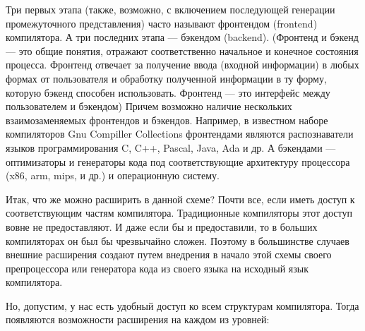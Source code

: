 \documentclass[a4paper,12pt,titlepage]{extarticle}
\begin{document}
Три первых этапа (также, возможно, с включением последующей генерации
промежуточного представления) часто называют фронтендом (frontend) компилятора.
А три последних этапа --- бэкендом (backend). (Фронтенд и бэкенд --- это общие
понятия, отражают соответственно начальное и конечное состояния процесса.
Фронтенд отвечает за получение ввода (входной информации) в любых формах от
пользователя и обработку полученной информации в ту форму, которую бэкенд
способен использовать. Фронтенд — это интерфейс между пользователем и
бэкендом)
Причем возможно наличие нескольких взаимозаменяемых фронтендов и бэкендов.
Например, в известном наборе компиляторов Gnu Compiller Collections фронтендами
являются распознаватели языков программирования C, C++, Pascal, Java, Ada и др.
А бэкендами --- оптимизаторы и генераторы кода под соответствующие архитектуру
процессора (x86, arm, mips, и др.) и операционную систему.

Итак, что же можно расширить в данной схеме? Почти все, если иметь доступ к
соответствующим частям компилятора. Традиционные компиляторы этот доступ вовне
не предоставляют. И даже если бы и предоставили, то в больших компиляторах он
был бы чрезвычайно сложен. Поэтому в большинстве случаев внешние расширения
создают путем внедрения в начало этой схемы своего препроцессора или генератора
кода из своего языка на исходный язык компилятора.

Но, допустим, у нас есть удобный доступ ко всем структурам компилятора. Тогда
появляются возможности расширения на каждом из уровней:
\end{document}

